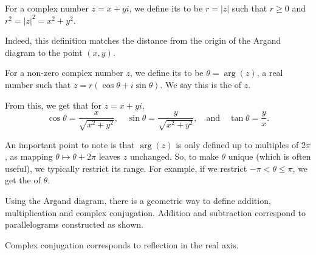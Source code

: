 \documentclass[a4paper]{scrartcl}
\begin{document}
\begin{definition}[Modulus]
	For a complex number $z = x + yi$, we define its  to be $r = |z|$ such that $r \geq 0$ and $r^2 = |z|^2 = x^2 + y^2$.
\end{definition}

Indeed, this definition matches the distance from the origin of the Argand diagram to the point $(x, y)$.

\begin{definition}[Argument]
	For a non-zero complex number $z$, we define its  to be $\theta = \arg(z)$, a real number such that $z = r(\cos \theta + i \sin \theta)$. We say this is the  of $z$.
\end{definition}

From this, we get that for $z = x + yi$,
$$
\cos \theta = \frac{x}{\sqrt{x^2 + y^2}}, \quad \sin \theta = \frac{y}{\sqrt{x^2 + y^2}}, \quad \text{and} \quad \tan \theta = \frac{y}{x}.
$$

An important point to note is that $\arg(z)$ is only defined up to multiples of $2 \pi$, as mapping $\theta \mapsto \theta + 2\pi$ leaves $z$ unchanged. So, to make $\theta$ unique (which is often useful), we typically restrict its range. For example, if we restrict $- \pi < \theta \leq \pi$, we get the  of $\theta$.

Using the Argand diagram, there is a geometric 
way to define addition, multiplication and complex conjugation. Addition and subtraction correspond to parallelograms constructed as shown.

\begin{center}
  \end{center}

  Complex conjugation corresponds to reflection in the real axis.
\end{document}
